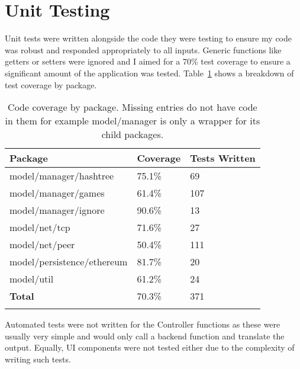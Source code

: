 \section{Unit Testing}

Unit tests were written alongside the code they were testing to ensure my code was robust and responded appropriately to all inputs. Generic functions like getters or setters were ignored and I aimed for a 70\% test coverage to ensure a significant amount of the application was tested. Table~\ref{tab:coverage} shows a breakdown of test coverage by package.

\begin{longtable}{p{} p{} p{}}
  \toprule
  \textbf{Package} & \textbf{Coverage} & \textbf{Tests Written}
  \\\midrule\midrule
  model/manager/hashtree
  & 75.1\%
  & 69
  \\
  model/manager/games
  & 61.4\%
  & 107
  \\
  model/manager/ignore
  & 90.6\%
  & 13
  \\
  model/net/tcp
  & 71.6\%
  & 27
  \\
  model/net/peer
  & 50.4\%
  & 111
  \\
  model/persistence/ethereum
  & 81.7\%
  & 20
  \\
  model/util
  & 61.2\%
  & 24
  \\\midrule\midrule
  \textbf{Total}
  & 70.3\%
  & 371
  \\\bottomrule\bottomrule
  \caption{Code coverage by package. Missing entries do not have code in them for example model/manager is only a wrapper for its child packages.}
  \label{tab:coverage}
\end{longtable}

\noindent
Automated tests were not written for the Controller functions as these were usually very simple and would only call a backend function and translate the output. Equally, UI components were not tested either due to the complexity of writing such tests.
